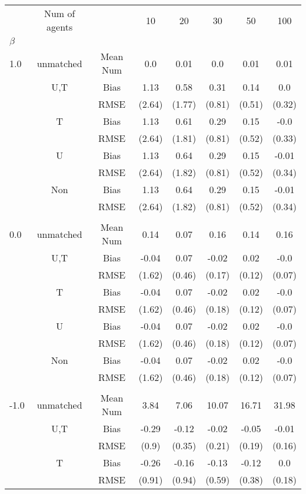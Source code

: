 \begin{tabular}{@{\extracolsep{5pt}}lc|cccccc}
\toprule 
 & Num of agents &  & 10 & 20 & 30 & 50 & 100 \\
$\beta$ &  &  &  &  &  &  &  \\
\midrule 
1.0 & unmatched & Mean Num & 0.0 & 0.01 & 0.0 & 0.01 & 0.01 \\
 & U,T & Bias & 1.13 & 0.58 & 0.31 & 0.14 & 0.0 \\
 &  & RMSE & (2.64) & (1.77) & (0.81) & (0.51) & (0.32) \\
 & T & Bias & 1.13 & 0.61 & 0.29 & 0.15 & -0.0 \\
 &  & RMSE & (2.64) & (1.81) & (0.81) & (0.52) & (0.33) \\
 & U & Bias & 1.13 & 0.64 & 0.29 & 0.15 & -0.01 \\
 &  & RMSE & (2.64) & (1.82) & (0.81) & (0.52) & (0.34) \\
 & Non & Bias & 1.13 & 0.64 & 0.29 & 0.15 & -0.01 \\
 &  & RMSE & (2.64) & (1.82) & (0.81) & (0.52) & (0.34) \\
 &  &  &  &  &  &  &  \\
0.0 & unmatched & Mean Num & 0.14 & 0.07 & 0.16 & 0.14 & 0.16 \\
 & U,T & Bias & -0.04 & 0.07 & -0.02 & 0.02 & -0.0 \\
 &  & RMSE & (1.62) & (0.46) & (0.17) & (0.12) & (0.07) \\
 & T & Bias & -0.04 & 0.07 & -0.02 & 0.02 & -0.0 \\
 &  & RMSE & (1.62) & (0.46) & (0.18) & (0.12) & (0.07) \\
 & U & Bias & -0.04 & 0.07 & -0.02 & 0.02 & -0.0 \\
 &  & RMSE & (1.62) & (0.46) & (0.18) & (0.12) & (0.07) \\
 & Non & Bias & -0.04 & 0.07 & -0.02 & 0.02 & -0.0 \\
 &  & RMSE & (1.62) & (0.46) & (0.18) & (0.12) & (0.07) \\
 &  &  &  &  &  &  &  \\
-1.0 & unmatched & Mean Num & 3.84 & 7.06 & 10.07 & 16.71 & 31.98 \\
 & U,T & Bias & -0.29 & -0.12 & -0.02 & -0.05 & -0.01 \\
 &  & RMSE & (0.9) & (0.35) & (0.21) & (0.19) & (0.16) \\
 & T & Bias & -0.26 & -0.16 & -0.13 & -0.12 & 0.0 \\
 &  & RMSE & (0.91) & (0.94) & (0.59) & (0.38) & (0.18) \\

\end{tabular}
